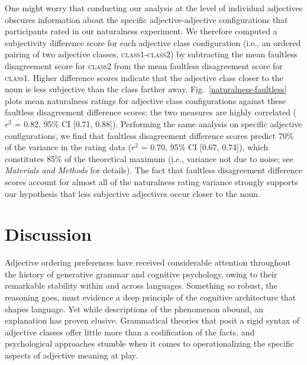 \documentclass{pnastwo}
\begin{document}
\begin{article}
One might worry that conducting our analysis at the level of individual adjectives obscures information about the specific adjective-adjective configurations that participants rated in our naturalness experiment.
We therefore computed a subjectivity difference score for each adjective class configuration (i.e., an ordered pairing of two adjective classes, \textsc{class1}-\textsc{class2}) by subtracting the mean faultless disagreement score for \textsc{class2} from the mean faultless disagreement score for \textsc{class1}. Higher difference scores indicate that the adjective class closer to the noun is less subjective than the class farther away. Fig.~\ref{naturalness-faultless} plots mean naturalness ratings for adjective class configurations against these faultless disagreement difference scores; the two measures are highly correlated ($r^2$ = 0.82, 95\% CI [0.71, 0.88]). Performing the same analysis on specific adjective configurations, we find that faultless disagreement difference scores predict 70\% of the variance in the rating data ($r^2$ = 0.70, 95\% CI [0.67, 0.74]), which constitutes 85\% of the theoretical maximum (i.e., variance not due to noise; see \emph{Materials and Methods} for details). The fact that faultless disagreement difference scores account for almost all of the naturalness rating variance strongly supports our hypothesis that less subjective adjectives occur closer to the noun. 

\section{Discussion}

Adjective ordering preferences have received considerable attention throughout the history of generative grammar and cognitive psychology, owing to their remarkable stability within and across languages. Something so robust, the reasoning goes, must evidence a deep principle of the cognitive architecture that shapes language. Yet while descriptions of the phenomenon abound, an explanation has proven elusive. Grammatical theories that posit a rigid syntax of adjective classes offer little more than a codification of the facts, and psychological approaches stumble when it comes to operationalizing the specific aspects of adjective meaning at play. 


\end{article}
\end{document}
